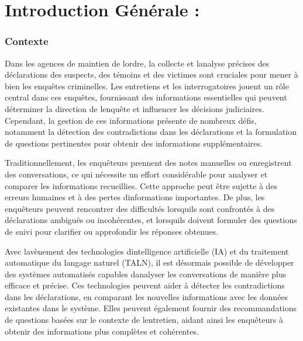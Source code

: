 \documentclass[
]{article}
\begin{document}
\section{}\label{section-9}

\section{}\label{section-10}

\section{}\label{section-11}

\section{Introduction Générale :}\label{introduction-guxe9nuxe9rale}

\subsubsection{\texorpdfstring{\textbf{Contexte}}{Contexte}}\label{contexte}

Dans les agences de maintien de l\textquotesingle ordre, la collecte et
l\textquotesingle analyse précises des déclarations des suspects, des
témoins et des victimes sont cruciales pour mener à bien les enquêtes
criminelles. Les entretiens et les interrogatoires jouent un rôle
central dans ces enquêtes, fournissant des informations essentielles qui
peuvent déterminer la direction de l\textquotesingle enquête et
influencer les décisions judiciaires. Cependant, la gestion de ces
informations présente de nombreux défis, notamment la détection des
contradictions dans les déclarations et la formulation de questions
pertinentes pour obtenir des informations supplémentaires.

Traditionnellement, les enquêteurs prennent des notes manuelles ou
enregistrent des conversations, ce qui nécessite un effort considérable
pour analyser et comparer les informations recueillies. Cette approche
peut être sujette à des erreurs humaines et à des pertes
d\textquotesingle informations importantes. De plus, les enquêteurs
peuvent rencontrer des difficultés lorsqu\textquotesingle ils sont
confrontés à des déclarations ambiguës ou incohérentes, et
lorsqu\textquotesingle ils doivent formuler des questions de suivi pour
clarifier ou approfondir les réponses obtenues.

Avec l\textquotesingle avènement des technologies
d\textquotesingle intelligence artificielle (IA) et du traitement
automatique du langage naturel (TALN), il est désormais possible de
développer des systèmes automatisés capables d\textquotesingle analyser
les conversations de manière plus efficace et précise. Ces technologies
peuvent aider à détecter les contradictions dans les déclarations, en
comparant les nouvelles informations avec les données existantes dans le
système. Elles peuvent également fournir des recommandations de
questions basées sur le contexte de l\textquotesingle entretien, aidant
ainsi les enquêteurs à obtenir des informations plus complètes et
cohérentes.
\end{document}
